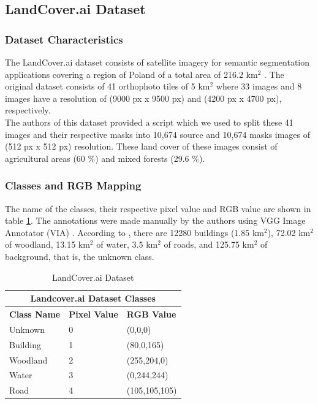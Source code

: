\documentclass[conference]{IEEEtran}
\begin{document}
\subsection{LandCover.ai Dataset}



\subsubsection{Dataset Characteristics}
The LandCover.ai dataset consists of satellite imagery for semantic segmentation applications covering a region of Poland of a total area of 216.2 km$^2$ \cite{DBLP:journals/corr/abs-2005-02264}. The original dataset consists of 41 orthophoto tiles of 5 km$^2$ where 33 images and 8 images have a resolution of (9000 px x 9500 px) and (4200 px x 4700 px), respectively. \\ \indent
The authors of this dataset \cite{DBLP:journals/corr/abs-2005-02264} provided a script which we used to split these 41 images and their respective masks into 10,674 source and 10,674 masks images of (512 px x 512 px) resolution. These land cover of these images consist of agricultural areas (60 \%) and mixed forests (29.6 \%). \\ \indent



\subsubsection{Classes and RGB Mapping}
The name of the classes, their respective pixel value and RGB value are shown in table \ref{landcover_ai_classes}. The annotations were made manually by the authors using VGG  Image Annotator (VIA) \cite{dutta2019vgg}. According to \cite{DBLP:journals/corr/abs-2005-02264}, there are 12280 buildings (1.85 km$^2$), 72.02 km$^2$ of woodland, 13.15 km$^2$ of water, 3.5 km$^2$ of roads, and 125.75 km$^2$ of background, that is, the unknown class.

\begin{table}[htbp]
\centering
\caption{LandCover.ai Dataset}
\begin{tabular}{|p{1.2cm}|p{0.7cm}|p{1.6cm}|}
 \hline
 \multicolumn{3}{|c|}{\textbf{Landcover.ai Dataset Classes}} \\
 \hline
 \textbf{Class Name} & \textbf{Pixel Value}& \textbf{RGB Value} \\
 \hline
 Unknown & 0  & (0,0,0)\\ 
 \hline
 Building & 1  & (80,0,165)\\ 
 \hline
 Woodland & 2  & (255,204,0)\\ 
 \hline
 Water & 3  & (0,244,244)\\ 
 \hline
 Road & 4  & (105,105,105)\\ 
 \hline
\end{tabular}
\label{landcover_ai_classes}
\end{table}
\end{document}
